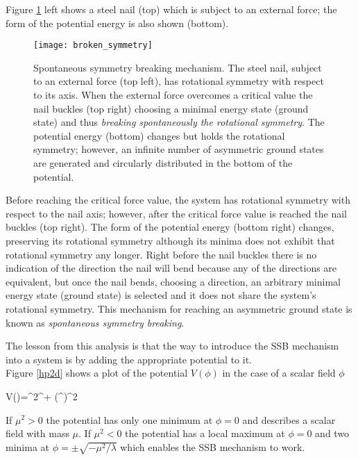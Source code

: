 Figure \ref{ssb} left shows a steel nail (top) which is subject to an external force; the form of the potential energy is also shown (bottom).\\ 
\begin{figure}[!h]
\centering
\texttt{[image: broken\_symmetry]}
\caption[Spontaneous symmetry breaking mechanism]{Spontaneous symmetry breaking mechanism. The steel nail, subject to an external force (top left), has rotational symmetry with respect to its axis. When the external force overcomes a critical value the nail buckles (top right) choosing a minimal energy state (ground state) and thus \textit{breaking spontaneously the rotational symmetry}. The potential energy (bottom) changes but holds the rotational symmetry; however, an infinite number of asymmetric ground states are generated and circularly distributed in the bottom of the potential\cite{broken_symmetry}.}
\label{ssb}
\end{figure}

Before reaching the critical force value, the system has rotational symmetry with respect to the nail axis; however, after the critical force value is reached the nail buckles (top right). The form of the potential energy (bottom right) changes, preserving its rotational symmetry although its minima does not exhibit that rotational symmetry any longer. Right before the nail buckles there is no indication of the direction the nail will bend because any of the directions are equivalent, but once the nail bends, choosing a direction, an arbitrary minimal energy state (ground state) is selected and it does not share the system's rotational symmetry. This mechanism for reaching an asymmetric ground state is known as \textit{spontaneous symmetry breaking}.       

The lesson from this analysis is that the way to introduce the SSB mechanism into a system is by adding the appropriate potential to it.\\ 

Figure \ref{hp2d} shows a plot of the potential $V(\phi)$ in the case of a scalar field $\phi$

\beqn\label{Higgs_potential}
V(\phi)=\mu^2\phi^\dagger\phi + \lambda(\phi^\dagger\phi)^2
\eeqn

If $\mu^2>0$ the potential has only one minimum at $\phi=0$ and describes a scalar field with mass $\mu$. If $\mu^2<0$ the potential has a local maximum at $\phi=0$ and two minima at $\phi=\pm \sqrt{-\mu^2/\lambda}$ which enables the SSB mechanism to work.\\ 

